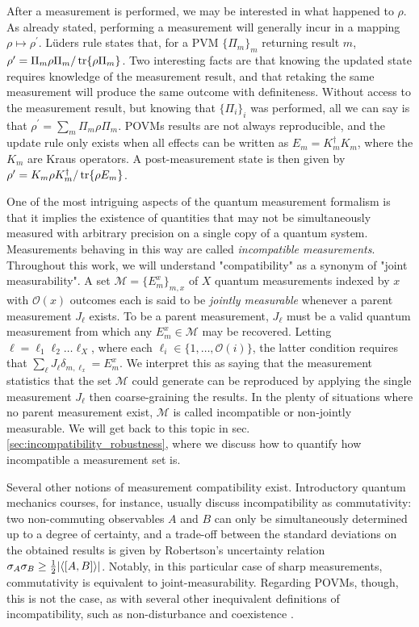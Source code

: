 		After a measurement is performed, we may be interested in what happened to $\rho$. As already stated, performing a measurement will generally incur in a mapping $\rho \mapsto \rho^\prime$. Lüders rule states that, for a PVM $\{ \Pi_m \}_m$ returning result $m$, $\rho^\prime = \Pi_m \rho \Pi_m / \tr{\rho \Pi_m}$. Two interesting facts are that knowing the updated state requires knowledge of the measurement result, and that retaking the same measurement will produce the same outcome with definiteness. Without access to the measurement result, but knowing that $\{ \Pi_i \}_i$ was performed, all we can say is that $\rho^\prime = \sum_m \Pi_m \rho \Pi_m$. POVMs results are not always reproducible, and the update rule only exists when all effects can be written as $E_m = K_m^\dagger K_m$, where the $K_m$ are Kraus operators. A post-measurement state is then given by $\rho^\prime = K_m \rho K_m^\dagger / \tr{\rho E_m}$.
		
		One of the most intriguing aspects of the quantum measurement formalism is that it implies the existence of quantities that may not be simultaneously measured with arbitrary precision on a single copy of a quantum system. Measurements behaving in this way are called \emph{incompatible measurements}. Throughout this work, we will understand "compatibility" as a synonym of "joint measurability". A set $\mathcal{M} = \{E_m^x \}_{m, x}$ of $X$ quantum measurements indexed by $x$ with $\mathcal{O}(x)$ outcomes each is said to be \emph{jointly measurable} whenever a parent measurement $J_\ell$ exists. To be a parent measurement, $J_\ell$ must be a valid quantum measurement from which any $E_m^x \in \mathcal{M}$ may be recovered. Letting $\ell = \ell_1\ell_2\ldots\ell_X$, where each $\ell_i \in \{ 1, \ldots, \mathcal{O}(i) \}$, the latter condition requires that $\sum_\ell J_\ell \delta_{m, \ell_x} = E_m^x$. We interpret this as saying that the measurement statistics that the set $\mathcal{M}$ could generate can be reproduced by applying the single measurement $J_\ell$ then coarse-graining the results. In the plenty of situations where no parent measurement exist, $\mathcal{M}$ is called incompatible or non-jointly measurable. We will get back to this topic in sec. \ref{sec:incompatibility_robustness}, where we discuss how to quantify how incompatible a measurement set is.
		
		Several other notions of measurement compatibility exist. Introductory quantum mechanics courses, for instance, usually discuss incompatibility as commutativity: two non-commuting observables $A$ and $B$ can only be simultaneously determined up to a degree of certainty, and a trade-off between the standard deviations on the obtained results is given by Robertson's uncertainty relation $\sigma_A \sigma_B \geq \frac{1}{2} \abs{ \langle \left[ A, B \right] \rangle }$. Notably, in this particular case of sharp measurements, commutativity is equivalent to joint-measurability. Regarding POVMs, though, this is not the case, as with several other inequivalent definitions of incompatibility, such as non-disturbance and coexistence \cite{heinosaari_2016_incompatible}.
		
